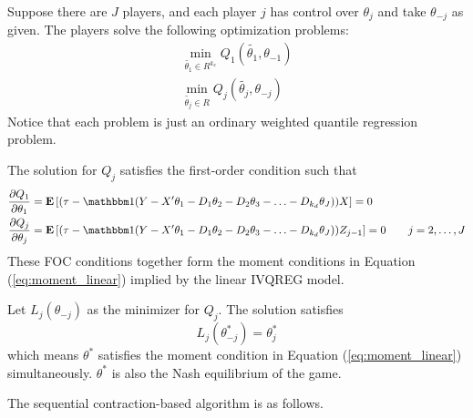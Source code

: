Suppose there are $J$ players, and each player $j$ has control over $\theta_j$
and take $\theta_{-j}$ as given. The players solve the following optimization
problems:
\begin{align}
	\min_{\tilde{\theta_1}\in R^{k_x}} Q_1(\tilde{\theta_1}, \theta_{-1}) \\
	\min_{\tilde{\theta_j}\in R} Q_j(\tilde{\theta_j}, \theta_{-j}) 
\end{align}
Notice that each problem is just an ordinary weighted quantile regression
problem. 

The solution for $Q_j$ satisfies the first-order condition such that 
\begin{align}
\frac{\partial Q_1}{\partial \theta_1} &= \E\left[ 
	(\tau - \I(
Y - X'\theta_1 - D_1\theta_2 - D_2\theta_3 - \ldots - D_{k_d}\theta_J )
	)X
	\right] = 0 \\
\frac{\partial Q_j}{\partial \theta_j} &= \E\left[ 
	(\tau - \I(
Y - X'\theta_1 - D_1\theta_2 - D_2\theta_3 - \ldots - D_{k_d}\theta_J )
	)Z_{j-1}
	\right] = 0  \qquad j = 2, \ldots, J 
\end{align}
These FOC conditions together form the moment conditions in Equation
(\ref{eq:moment_linear}) implied by the linear IVQREG model. 

Let $L_j(\theta_{-j})$ as the minimizer for $Q_j$. The solution satisfies
$$
	L_j(\theta_{-j}^*) = \theta_j^*
$$
which means $\theta^*$ satisfies the moment condition in Equation
(\ref{eq:moment_linear}) simultaneously. $\theta^*$ is also the Nash equilibrium
of the game.

The sequential contraction-based algorithm is as follows.

